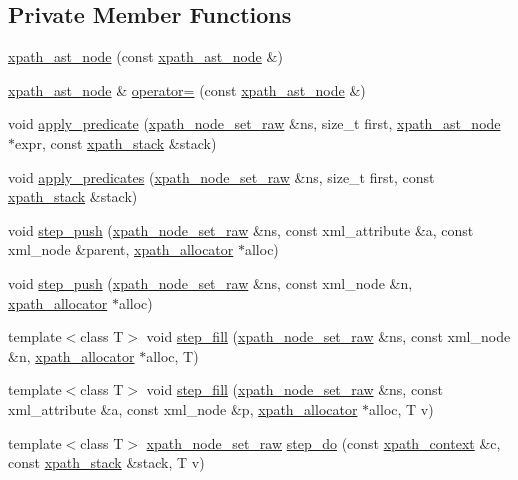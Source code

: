 \subsection*{Private Member Functions}
\begin{CompactItemize}
\item 
\hyperlink{classxpath__ast__node_e5a059e41b41505bef1f7dbebda8070b}{xpath\_\-ast\_\-node} (const \hyperlink{classxpath__ast__node}{xpath\_\-ast\_\-node} \&)
\item 
\hyperlink{classxpath__ast__node}{xpath\_\-ast\_\-node} \& \hyperlink{classxpath__ast__node_60fddea92b095c2b8705f12f7309e6aa}{operator=} (const \hyperlink{classxpath__ast__node}{xpath\_\-ast\_\-node} \&)
\item 
void \hyperlink{classxpath__ast__node_fcefe6b386c214349c5e23f13828fa1e}{apply\_\-predicate} (\hyperlink{classxpath__node__set__raw}{xpath\_\-node\_\-set\_\-raw} \&ns, size\_\-t first, \hyperlink{classxpath__ast__node}{xpath\_\-ast\_\-node} $\ast$expr, const \hyperlink{structxpath__stack}{xpath\_\-stack} \&stack)
\item 
void \hyperlink{classxpath__ast__node_e5e3b5fec836d9478ebd195dda7fdedd}{apply\_\-predicates} (\hyperlink{classxpath__node__set__raw}{xpath\_\-node\_\-set\_\-raw} \&ns, size\_\-t first, const \hyperlink{structxpath__stack}{xpath\_\-stack} \&stack)
\item 
void \hyperlink{classxpath__ast__node_a141bfbd4d5e42da83f0de8f729eb849}{step\_\-push} (\hyperlink{classxpath__node__set__raw}{xpath\_\-node\_\-set\_\-raw} \&ns, const xml\_\-attribute \&a, const xml\_\-node \&parent, \hyperlink{classxpath__allocator}{xpath\_\-allocator} $\ast$alloc)
\item 
void \hyperlink{classxpath__ast__node_7083f1a6c3d4128bb8a4ac147851a86b}{step\_\-push} (\hyperlink{classxpath__node__set__raw}{xpath\_\-node\_\-set\_\-raw} \&ns, const xml\_\-node \&n, \hyperlink{classxpath__allocator}{xpath\_\-allocator} $\ast$alloc)
\item 
template$<$class T$>$ void \hyperlink{classxpath__ast__node_2fb0bf78cbdbe0bb032d37f765eab816}{step\_\-fill} (\hyperlink{classxpath__node__set__raw}{xpath\_\-node\_\-set\_\-raw} \&ns, const xml\_\-node \&n, \hyperlink{classxpath__allocator}{xpath\_\-allocator} $\ast$alloc, T)
\item 
template$<$class T$>$ void \hyperlink{classxpath__ast__node_0da76bbadd9b254cf56649392c686c2a}{step\_\-fill} (\hyperlink{classxpath__node__set__raw}{xpath\_\-node\_\-set\_\-raw} \&ns, const xml\_\-attribute \&a, const xml\_\-node \&p, \hyperlink{classxpath__allocator}{xpath\_\-allocator} $\ast$alloc, T v)
\item 
template$<$class T$>$ \hyperlink{classxpath__node__set__raw}{xpath\_\-node\_\-set\_\-raw} \hyperlink{classxpath__ast__node_326147ab8def5110e44deafd73b20393}{step\_\-do} (const \hyperlink{structxpath__context}{xpath\_\-context} \&c, const \hyperlink{structxpath__stack}{xpath\_\-stack} \&stack, T v)
\end{CompactItemize}
